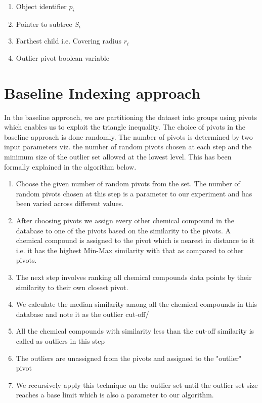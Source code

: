 \begin{enumerate}
	\item Object identifier $p_i$
	\item Pointer to subtree $S_i$
	\item Farthest child i.e. Covering radius $r_i$
	\item Outlier pivot boolean variable
\end{enumerate}

\section{Baseline Indexing approach}
In the baseline approach, we are partitioning the dataset into groups using pivots which enables us to exploit the triangle inequality. The choice of pivots in the baseline approach is done randomly. The number of pivots is determined by two input parameters viz. the number of random pivots chosen at each step and the minimum size of the outlier set allowed at the lowest level. This has been formally explained in the algorithm below. \\

\begin{enumerate}

\item Choose the given number of random pivots from the set. The number of random pivots chosen at this step is a parameter to our experiment and has been varied across different values.

\item After choosing pivots we assign every other chemical compound in the database to one of the pivots based on the similarity to the pivots. A chemical compound is assigned to the pivot which is nearest in distance to it i.e. it has the highest Min-Max similarity with that as compared to other pivots.

\item The next step involves ranking all chemical compounds data points by their similarity to their own closest pivot. 

\item We calculate the median similarity among all the chemical compounds in this database and note it as the outlier cut-off/

\item All the chemical compounds with similarity less than the cut-off similarity is called as outliers in this step

\item The outliers are unassigned from the pivots and assigned to the "outlier" pivot

\item We recursively apply this technique on the outlier set until the outlier set size reaches a base limit which is also a parameter to our algorithm.\\

\end{enumerate}


